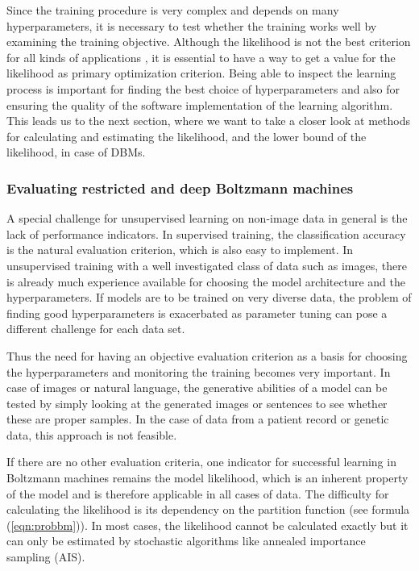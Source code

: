 \documentclass[12pt]{article}
\begin{document}
Since the training procedure is very complex and depends on many hyperparameters, it is necessary to test whether the training works well by examining the training objective.
Although the likelihood is not the best criterion for all kinds of applications \citep{theis_note_2015}, it is essential to have a way to get a value for the likelihood as primary optimization criterion.
Being able to inspect the learning process is important for finding the best choice of hyperparameters and also for ensuring the quality of the software implementation of the learning algorithm.
This leads us to the next section, where we want to take a closer look at methods for calculating and estimating the likelihood, and the lower bound of the likelihood, in case of DBMs.


\subsubsection{Evaluating restricted and deep Boltzmann machines}
A special challenge for unsupervised learning on non-image data in general is the lack of performance indicators.
In supervised training, the classification accuracy is the natural evaluation criterion, which is also easy to implement.
In unsupervised training with a well investigated class of data such as images, there is already much experience available for choosing the model architecture and the hyperparameters. If models are to be trained on very diverse data, the problem of finding good hyperparameters is exacerbated as parameter tuning can pose a different challenge for each data set.

Thus the need for having an objective evaluation criterion as a basis for choosing the hyperparameters and monitoring the training becomes very important.
In case of images or natural language, the generative abilities of a model can be tested by simply looking at the generated images or sentences to see whether these are proper samples. In the case of data from a patient record or genetic data, this approach is not feasible.

If there are no other evaluation criteria, one indicator for successful learning in Boltzmann machines remains the model likelihood, which is an inherent property of the model and is therefore applicable in all cases of data. The difficulty for calculating the likelihood is its dependency on the partition function (see formula (\ref{eqn:probbm})).
In most cases, the likelihood cannot be calculated exactly but it can only be estimated by stochastic algorithms like annealed importance sampling (AIS). 
\end{document}
